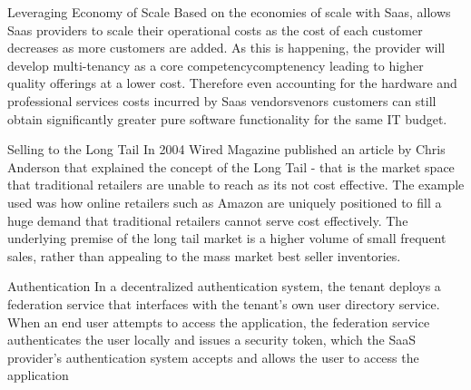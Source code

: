 \documentclass{article}
\begin{document}
Leveraging Economy of Scale 
Based on the economies of scale with Saas, allows Saas providers to scale their operational costs as the cost of each customer decreases as more customers are added. As this is happening, the provider will develop multi-tenancy as a core competencycomptenency leading to higher quality offerings at a lower cost. Therefore even accounting for the hardware and professional services costs incurred by Saas vendorsvenors customers can still obtain significantly greater pure software functionality for the same IT budget. 

Selling to the Long Tail
In 2004 Wired Magazine published an article by Chris Anderson that explained the concept of the Long Tail - that is the market space that traditional retailers are unable to reach as its not cost effective. The example used was how online retailers such as Amazon are uniquely positioned to fill a huge demand that traditional retailers cannot serve cost effectively. The underlying premise of the long tail market is a higher volume of small frequent sales, rather than appealing to the mass market best seller inventories.

Authentication
In a decentralized authentication system, the tenant deploys a federation service that interfaces with the tenant's own user directory service. When an end user attempts to access the application, the federation service authenticates the user locally and issues a security token, which the SaaS provider's authentication system accepts and allows the user to access the application
\end{document}
